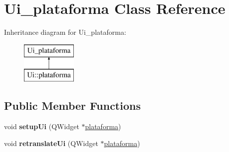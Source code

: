 \hypertarget{class_ui__plataforma}{}\section{Ui\+\_\+plataforma Class Reference}
\label{class_ui__plataforma}
Inheritance diagram for Ui\+\_\+plataforma\+:\begin{figure}[H]
\begin{center}
\leavevmode
\includegraphics[height=2.000000cm]{class_ui__plataforma}
\end{center}
\end{figure}
\subsection*{Public Member Functions}
\begin{DoxyCompactItemize}
\item 
\mbox{\label{class_ui__plataforma_a5ac882befb022b15a571bcd5589dbacb}} 
void {\bfseries setup\+Ui} (Q\+Widget $\ast$\hyperlink{classplataforma}{plataforma})
\item 
\mbox{\label{class_ui__plataforma_aae918034c87c91b40e1ecccab8b5cbd0}} 
void {\bfseries retranslate\+Ui} (Q\+Widget $\ast$\hyperlink{classplataforma}{plataforma})
\end{DoxyCompactItemize}
